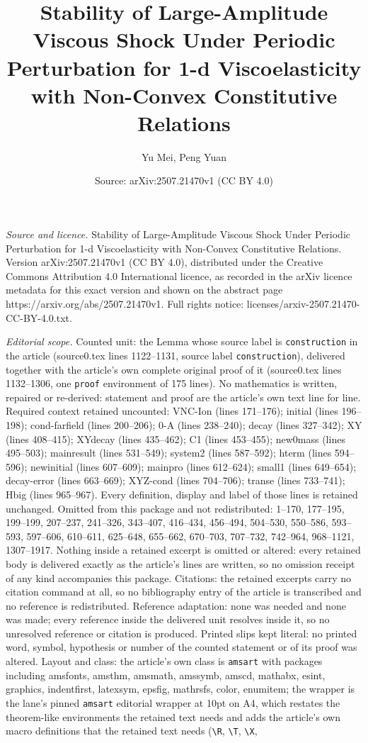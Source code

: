 \documentclass[10pt,a4paper]{amsart}
\title[Stability of Large-Amplitude Viscous Shock Under Periodic Pe]{Stability of Large-Amplitude Viscous Shock Under Periodic Perturbation for 1-d Viscoelasticity with Non-Convex Constitutive Relations}
\author{Yu Mei, Peng Yuan}
\date{Source: arXiv:2507.21470v1 (CC BY 4.0)}
\begin{document}
\maketitle

\noindent\emph{Source and licence.} Stability of Large-Amplitude Viscous Shock Under Periodic Perturbation for 1-d Viscoelasticity with Non-Convex Constitutive Relations. Version arXiv:2507.21470v1 (CC BY 4.0), distributed under the Creative Commons Attribution 4.0 International licence, as recorded in the arXiv licence metadata for this exact version and shown on the abstract page https://arxiv.org/abs/2507.21470v1. Full rights notice: licenses/arxiv-2507.21470-CC-BY-4.0.txt.\par\smallskip

\noindent\textit{Editorial scope.} Counted unit: the Lemma whose source label is \texttt{construction} in the article (source0.tex lines 1122--1131, source label \texttt{construction}), delivered together with the article's own complete original proof of it (source0.tex lines 1132--1306, one \texttt{proof} environment of 175 lines). No mathematics is written, repaired or re-derived: statement and proof are the article's own text line for line. Required context retained uncounted: VNC-Ion (lines 171--176); initial (lines 196--198); cond-farfield (lines 200--206); 0-A (lines 238--240); decay (lines 327--342); XY (lines 408--415); XYdecay (lines 435--462); C1 (lines 453--455); new0mass (lines 495--503); mainresult (lines 531--549); system2 (lines 587--592); hterm (lines 594--596); newinitial (lines 607--609); mainpro (lines 612--624); small1 (lines 649--654); decay-error (lines 663--669); XYZ-cond (lines 704--706); transe (lines 733--741); Hbig (lines 965--967). Every definition, display and label of those lines is retained unchanged. Omitted from this package and not redistributed: 1--170, 177--195, 199--199, 207--237, 241--326, 343--407, 416--434, 456--494, 504--530, 550--586, 593--593, 597--606, 610--611, 625--648, 655--662, 670--703, 707--732, 742--964, 968--1121, 1307--1917. Nothing inside a retained excerpt is omitted or altered: every retained body is delivered exactly as the article's lines are written, so no omission receipt of any kind accompanies this package. Citations: the retained excerpts carry no citation command at all, so no bibliography entry of the article is transcribed and no reference is redistributed. Reference adaptation: none was needed and none was made; every reference inside the delivered unit resolves inside it, so no unresolved reference or citation is produced. Printed slips kept literal: no printed word, symbol, hypothesis or number of the counted statement or of its proof was altered. Layout and class: the article's own class is \texttt{amsart} with packages including amsfonts, amsthm, amsmath, amssymb, amscd, mathabx, esint, graphics, indentfirst, latexsym, epsfig, mathrsfs, color, enumitem; the wrapper is the lane's pinned \texttt{amsart} editorial wrapper at 10pt on A4, which restates the theorem-like environments the retained text needs and adds the article's own macro definitions that the retained text needs (\texttt{\textbackslash R}, \texttt{\textbackslash T}, \texttt{\textbackslash X}, 
\end{document}
